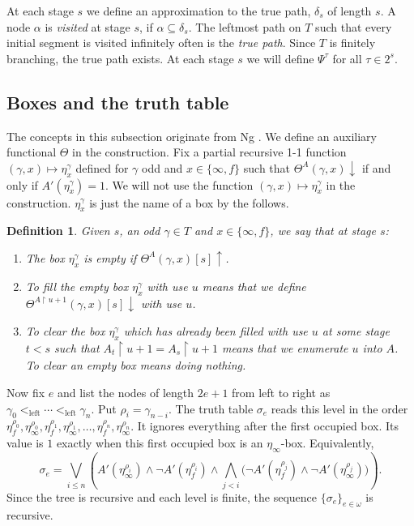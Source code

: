 \documentclass[10pt,a4paper]{amsart}
\newtheorem{definition}[theorem]{Definition}
\begin{document}
At each stage $s$ we define an approximation to the true path, $\delta_s$ of length $s$. A node $\alpha$ is {\emph{visited}} at stage $s$, if
$\alpha \subseteq \delta_s$. The leftmost path on $T$ such that every initial segment
is visited infinitely often is the {\emph{true path}}. Since $T$ is finitely branching, the true path exists. At each stage $s$
we will define $\Psi^{\tau}$ for all $\tau \in 2^s$.

\subsection{Boxes and the truth table}\label{not} The concepts in this subsection originate from Ng {\cite{MR2387945}}. We define an auxiliary
functional $\Theta$ in the construction. Fix a partial recursive 1-1 function $(\gamma,x)\mapsto \eta_x^{\gamma}$ defined for $\gamma$ odd and $x \in \{\infty,f\}$ such that $\Theta^A (\gamma,x) \downarrow$ if and only if $A' (\eta_x^{\gamma}) = 1$.
We will not use the function $(\gamma,x)\mapsto \eta_x^{\gamma}$ in the construction. $\eta_x^{\gamma}$ is just the name of a box by the follows.

\begin{definition}
  Given $s$, an odd $\gamma \in T$ and $x \in \{ \infty, f \}$, we say that at stage $s$:
\begin{enumerate}[label=(\roman*)]
    \item The box $\eta_x^{\gamma}$ is {\emph{empty}} if $\Theta^{A} (\gamma,x)[s] \uparrow$.
    \item To {\emph{fill}} the empty box $\eta^{\gamma}_x$ with use $u$ means
  that we define $\Theta^{A \upharpoonright u + 1} (\gamma,x)[s] \downarrow$ with use
  $u$.
  \item To {\emph{clear}} the box $\eta^{\gamma}_x$ which has already been
  filled with use $u$ at some stage $t<s$ such that $A_t \upharpoonright u + 1 
  = A_s \upharpoonright u + 1$ means that we enumerate $u$ into $A$. To clear an empty box means doing nothing.
\end{enumerate}
\end{definition}



Now fix $e$ and list the nodes of length $2e+1$ from left to right as $\gamma_0<_{\mathrm{left}}\cdots
   <_{\mathrm{left}}\gamma_n$.
Put $\rho_i=\gamma_{n-i}$.  The truth table $\sigma_e$ reads this level in the order $\eta_f^{\rho_0},\eta_\infty^{\rho_0},
  \eta_f^{\rho_1},\eta_\infty^{\rho_1},\ldots,
  \eta_f^{\rho_n},\eta_\infty^{\rho_n}$.
It ignores everything after the first occupied box.  Its value is $1$ exactly
when this first occupied box is an $\eta_\infty$-box.  Equivalently,
\[
\sigma_e=
\bigvee_{i\le n}
  \left(
    A'(\eta_\infty^{\rho_i})\wedge
    \neg A'(\eta_f^{\rho_i})\wedge
    \bigwedge_{j<i}
      \bigl(\neg A'(\eta_f^{\rho_j})\wedge
             \neg A'(\eta_\infty^{\rho_j})\bigr)
  \right).
\]
Since the tree is recursive and each level is finite, the sequence
$\{\sigma_e\}_{e\in\omega}$ is recursive.
\end{document}
